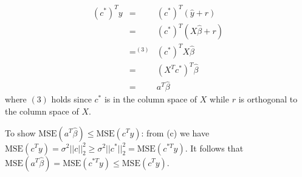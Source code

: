 \documentclass[11pt]{article}
\begin{document}
\begin{framed}
\begin{enumerate}
\textbf{
\begin{eqnarray*}
(c^{*})^{T}y & = & (c^{*})^{T}(\hat{{y}}+r)\\
 & = & (c^{*})^{T}(X\hat{{\beta}}+r)\\
 & =^{(3)} & (c^{*})^{T}X\hat{{\beta}}\\
 & = & (X^{T}c^{*})^{T}\hat{{\beta}}\\
 & = & a^{T}\hat{{\beta}}
\end{eqnarray*}
}where $(3)$ holds since $c^{*}$ is in the column space of $X$
while $r$ is orthogonal to the column space of $X$.

To show $\mbox{MSE}(a^{T}\hat{{\beta}})\le\mbox{MSE}(c^{T}y)$: from
(c) we have $\mbox{MSE}(c^{T}y)=\sigma^{2}||c||_{2}^{2}\ge\sigma^{2}||c^{*}||_{2}^{2}=\mbox{MSE}(c^{*T}y)$.
It follows that $\mbox{MSE}(a^{T}\hat{{\beta}})=\mbox{MSE}(c^{*T}y)\le\mbox{MSE}(c^{T}y)$. 
\end{enumerate}
\end{framed}
\end{document}
